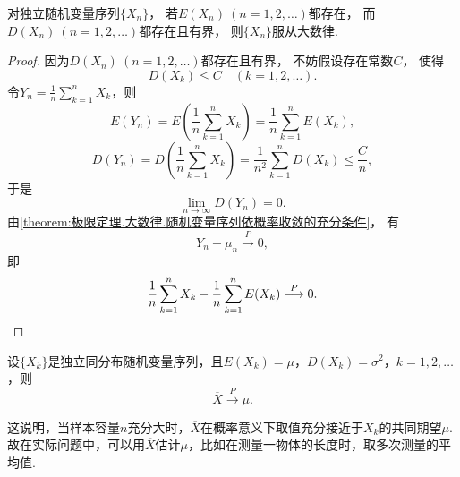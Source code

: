 \begin{theorem}[切比雪夫大数律]\label{theorem:极限定理.大数律.切比雪夫大数律}
对独立随机变量序列\(\{X_n\}\)，
若\(E(X_n)\ (n=1,2,\dotsc)\)都存在，
而\(D(X_n)\ (n=1,2,\dotsc)\)都存在且有界，
则\(\{X_n\}\)服从大数律.
\begin{proof}
因为\(D(X_n)\ (n=1,2,\dotsc)\)都存在且有界，
不妨假设存在常数\(C\)，
使得\[
	D(X_k) \leq C
	\quad(k=1,2,\dotsc).
\]
\def\Yn{\frac{1}{n} \sum_{k=1}^n{X_k}}
令\(Y_n=\Yn\)，则\[
	E(Y_n)
	= E\left(\Yn\right)
	= \frac{1}{n} \sum_{k=1}^n{E(X_k)},
\]\[
	D(Y_n)
	= D\left(\Yn\right)
	= \frac{1}{n^2} \sum_{k=1}^n{D(X_k)} \leq \frac{C}{n},
\]
于是\[
	\lim_{n\to\infty} D(Y_n)
	= 0.
\]
由\cref{theorem:极限定理.大数律.随机变量序列依概率收敛的充分条件}，
有\[
	Y_n - \mu_n \overset{P}{\longrightarrow} 0,
\]
即\[
	\frac{1}{n} \sum_{k=1}^n{X_k}
	- \frac{1}{n} \sum_{k=1}^n{E(X_k)}
	\overset{P}{\longrightarrow} 0.
	\qedhere
\]
\end{proof}
\end{theorem}

\begin{corollary}[独立同分布大数律]\label{theorem:极限定理.大数律.独立同分布大数律}
设\(\{X_k\}\)是独立同分布随机变量序列，且\(E(X_k)=\mu\)，\(D(X_k)=\sigma^2\)，\(k=1,2,\dotsc\)，则\[
\overline{X} \overset{P}{\longrightarrow} \mu.
\]
\end{corollary}
这说明，当样本容量\(n\)充分大时，\(\overline{X}\)在概率意义下取值充分接近于\(X_k\)的共同期望\(\mu\).
故在实际问题中，可以用\(\overline{X}\)估计\(\mu\)，比如在测量一物体的长度时，取多次测量的平均值.


